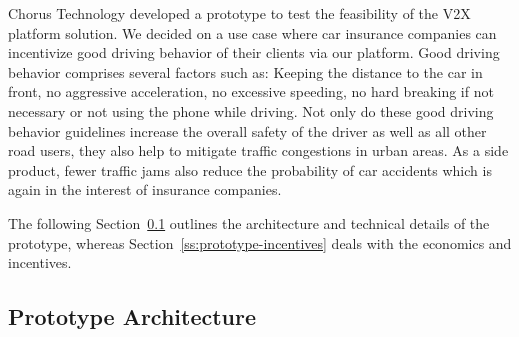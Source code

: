 \documentclass{llncs}
\begin{document}
{		Chorus Technology developed a prototype to test the feasibility of the V2X platform solution. We decided on a use case where car insurance companies can incentivize good driving behavior of their clients via our platform. Good driving behavior comprises several factors such as: Keeping the distance to the car in front, no aggressive acceleration, no excessive speeding, no hard breaking if not necessary or not using the phone while driving. Not only do these good driving behavior guidelines increase the overall safety of the driver as well as all other road users, they also help to mitigate traffic congestions in urban areas. As a side product, fewer traffic jams also reduce the probability of car accidents which is again in the interest of insurance companies.
		
		The following Section~\ref{ss:protoype-architecture} outlines the architecture and technical details of the prototype, whereas Section~\ref{ss:prototype-incentives} deals with the economics and incentives.
		
%		
%		
%		
%		

%		
%		
		
		\subsection{Prototype Architecture}
			\label{ss:protoype-architecture}				

}
\end{document}
